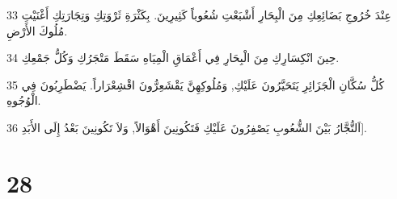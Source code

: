 \par 33 عِنْدَ خُرُوجِ بَضَائِعِكِ مِنَ الْبِحَارِ أَشْبَعْتِ شُعُوباً كَثِيرِينَ. بِكَثْرَةِ ثَرْوَتِكِ وَتِجَارَتِكِ أَغْنَيْتِ مُلُوكَ الأَرْضِ.
\par 34 حِينَ انْكِسَارِكِ مِنَ الْبِحَارِ فِي أَعْمَاقِ الْمِيَاهِ سَقَطَ مَتْجَرُكِ وَكُلُّ جَمْعِكِ.
\par 35 كُلُّ سُكَّانِ الْجَزَائِرِ يَتَحَيَّرُونَ عَلَيْكِ, وَمُلُوكِهِنَّ يَقْشَعِرُّونَ اقْشِعْرَاراً. يَضْطَرِبُونَ فِي الْوُجُوهِ.
\par 36 اَلتُّجَّارُ بَيْنَ الشُّعُوبِ يَصْفِرُونَ عَلَيْكِ فَتَكُونِينَ أَهْوَالاً, وَلاَ تَكُونِينَ بَعْدُ إِلَى الأَبَدِ].

\chapter{28}

